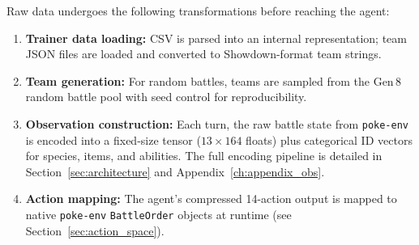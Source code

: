 Raw data undergoes the following transformations before reaching the agent:

\begin{enumerate}
  \item \textbf{Trainer data loading:} CSV is parsed into an internal
        representation; team JSON files are loaded and converted to
        Showdown-format team strings.
  \item \textbf{Team generation:} For random battles, teams are sampled from
        the Gen\,8 random battle pool with seed control for reproducibility.
  \item \textbf{Observation construction:} Each turn, the raw battle state
        from \texttt{poke-env} is encoded into a fixed-size tensor
        ($13 \times 164$ floats) plus categorical ID vectors for species,
        items, and abilities.  The full encoding pipeline is detailed in
        Section~\ref{sec:architecture} and Appendix~\ref{ch:appendix_obs}.
  \item \textbf{Action mapping:} The agent's compressed 14-action output is
        mapped to native \texttt{poke-env} \texttt{BattleOrder} objects at
        runtime (see Section~\ref{sec:action_space}).
\end{enumerate}
